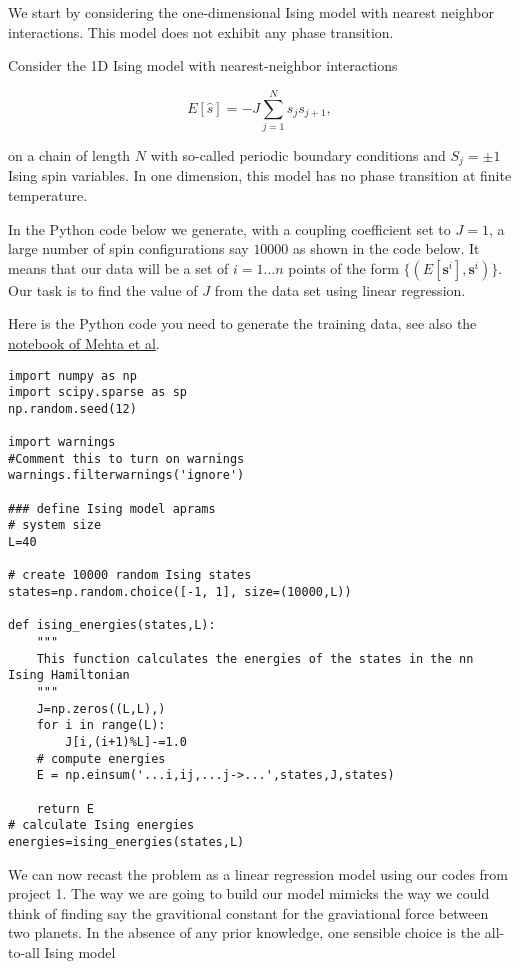 \documentclass[%
oneside,                 %
final,                   %
10pt]{article}
\begin{document}
We start by considering the one-dimensional Ising model with nearest neighbor interactions. This model does not exhibit any phase transition.

Consider the 1D Ising model with nearest-neighbor interactions 

\begin{equation*}
  E[\hat{s}]=-J\sum_{j=1}^{N}s_{j}s_{j+1},
\end{equation*}

on a chain of length $N$ with so-called periodic boundary conditions and $S_j=\pm 1$ Ising spin variables.
In one dimension, this model has no phase transition at finite temperature.

In the Python code below we generate, with a coupling coefficient set to $J=1$, a large number of spin configurations say $10000$ as shown in the code below.
It means that our data will be a set of $i=1\ldots n$ points of the form
$\{(E[\boldsymbol{s}^i],\boldsymbol{s}^i)\}$.
Our task is to find the value of $J$ from the data set using linear regression.

Here is the Python code you need to generate the training data, see
also the \href{{https://physics.bu.edu/~pankajm/ML-Notebooks/HTML/NB_CVI-linreg_ising.html}}{notebook of Mehta et
al}.

\begin{verbatim}
import numpy as np
import scipy.sparse as sp
np.random.seed(12)

import warnings
#Comment this to turn on warnings
warnings.filterwarnings('ignore')

### define Ising model aprams
# system size
L=40

# create 10000 random Ising states
states=np.random.choice([-1, 1], size=(10000,L))

def ising_energies(states,L):
    """
    This function calculates the energies of the states in the nn Ising Hamiltonian
    """
    J=np.zeros((L,L),)
    for i in range(L):
        J[i,(i+1)%L]-=1.0
    # compute energies
    E = np.einsum('...i,ij,...j->...',states,J,states)

    return E
# calculate Ising energies
energies=ising_energies(states,L)
\end{verbatim}

We can now recast the problem as a linear regression model using our codes from project 1.
The way we are going to build our model mimicks the way we could think of finding say the gravitional constant for the graviational force between two planets.
In the absence of any prior knowledge, one sensible choice is the all-to-all Ising model
\end{document}
